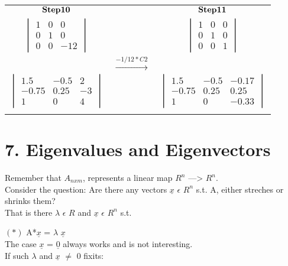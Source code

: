 \documentclass[]{article}
\begin{document}
\begin{tabular}{ c c c  }
$\bold{Step 10}$ &  & $\bold{Step 11}$\\
 $\begin{vmatrix} 1 & 0 & 0\\ 0 & 1 & 0 \\ 0 & 0 & -12 \end{vmatrix}$ &  & $\begin{vmatrix} 1 & 0 & 0\\ 0 & 1 & 0 \\ 0 & 0 & 1 \end{vmatrix}$ \\  
 & $\xrightarrow{-1/12*C2}$\\
 $\begin{vmatrix} 1.5 & -0.5 &   2\\ -0.75 & 0.25 &  -3 \\ 1 &   0 &   4 \end{vmatrix}$ &  & $\begin{vmatrix} 1.5 & -0.5 & -0.17\\ -0.75 & 0.25 & 0.25 \\ 1 & 0 & -0.33\end{vmatrix}$\\
 &  &  \\
\end{tabular}

\endgroup

\newpage

\section{\texorpdfstring{7. Eigenvalues and Eigenvectors\\
}{7. Eigenvalues and Eigenvectors }}\label{eigenvalues-and-eigenvectors}

Remember that \(A_{nxm}\), represents a linear map \(R^{n}\)
---\textgreater{} \(R^{n}\).\\
 Consider the question: Are there any vectors \(\underline{x}\)
\(\epsilon\) \(R^{n}\) s.t. A, either streches or shrinks them?\\
 That is there \(\lambda\) \(\epsilon\) \(R\) and \(\underline{x}\)
\(\epsilon\) \(R^{n}\) s.t.\\
 \hspace{3cm}

\((*)\) A*\(\underline{x}\) = \(\lambda\) \(\underline{x}\)\\
 The case \(\underline{x}\) = \(\underline{0}\) always works and is not
interesting.\\
 If such \(\lambda\) and \(\underline{x}\) \(\not=\) 0 fixits:
\end{document}
